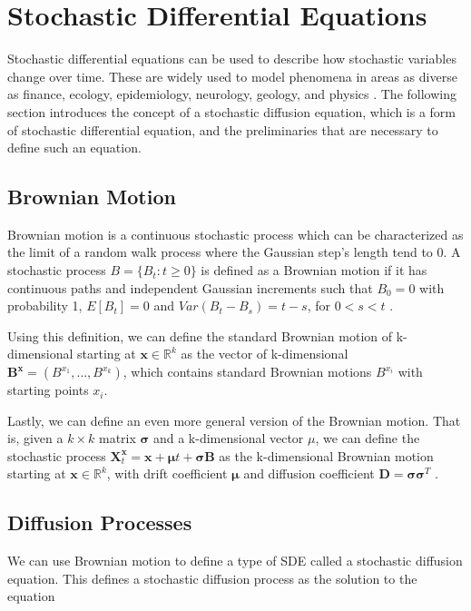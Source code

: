 
\section{Stochastic Differential Equations}
Stochastic differential equations can be used to describe how stochastic variables change over time. These are widely used to model phenomena in areas as diverse as finance, ecology, epidemiology, neurology, geology, and physics \parencite{iacus_simulation_2008}. The following section introduces the concept of a stochastic diffusion equation, which is a form of stochastic differential equation, and the preliminaries that are necessary to define such an equation.


\subsection{Brownian Motion}
Brownian motion is a continuous stochastic process which can be characterized as the limit of a random walk process where the Gaussian step's length tend to 0. A stochastic process $B = \{B_t:t\geq 0\}$ is defined as a Brownian motion if it has continuous paths and independent Gaussian increments such that $B_0 = 0$ with probability 1, $E[B_t] = 0$ and $Var(B_t - B_s) = t-s$, for $0 < s < t$ \parencite{iacus_simulation_2008}.  


Using this definition, we can define the standard Brownian motion of k-dimensional starting at $\textbf{x} \in \mathbb{R}^k$ as the vector of k-dimensional $\mathbf{B}^\mathbf{x} = (B^{x_1}, \dots , B^{x_k})$, which contains standard Brownian motions $B^{x_i}$ with starting points $x_i$\parencite{bhattacharya_continuous_2023}.

Lastly, we can define an even more general version of the Brownian motion. That is, given a $k \times k$ matrix $\pmb{\sigma}$ and a k-dimensional vector $\mu$, we can define the stochastic process $\mathbf{X}_t^\mathbf{x} = \mathbf{x} + \pmb{\mu}t + \pmb{\sigma} \mathbf{B}$ as the k-dimensional Brownian motion starting at $\mathbf{x} \in \mathbb{R}^k$, with drift coefficient $\pmb{\mu}$ and diffusion coefficient $\mathbf{D} = \pmb{\sigma} \pmb{\sigma}^T$ \parencite{bhattacharya_continuous_2023}.

\cite{michelot_langevin_2019}




\subsection{Diffusion Processes}
\label{sec: diffusion processes}
We can use Brownian motion to define a type of SDE called a stochastic diffusion equation. This defines a stochastic diffusion process as the solution to the equation

